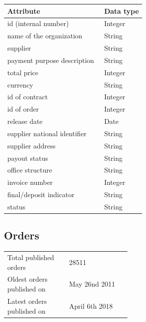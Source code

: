 \documentclass[thesis=B,english]{FITthesis}[2012/06/26]
\begin{document}
    \begin{center}
        \begin{tabular}{  p{0.7\linewidth} | p{0.3\linewidth} }
        Attribute & Data type\\ \hline
        id (internal number) & Integer \\
        name of the organization & String \\
        supplier & String \\
        payment purpose description & String \\
        total price & Integer \\
        currency & String \\
        id of contract & Integer \\
        id of order & Integer \\
        release date & Date \\
        supplier national identifier & String \\
        supplier address & String \\
        payout status & String \\
        office structure & String \\
        invoice number & Integer \\
        final/deposit indicator & String \\
        status & String \\
        \end{tabular}
    \end{center}
	\subsection{Orders}
	\begin{tabular}{  p{0.5\linewidth}  l }
        \\
        Total published orders & 28511 \\
        Oldest orders published on & May 26nd 2011\\
        Latest orders published on & April 6th 2018 \\
        \end{tabular}
        
\end{document}
